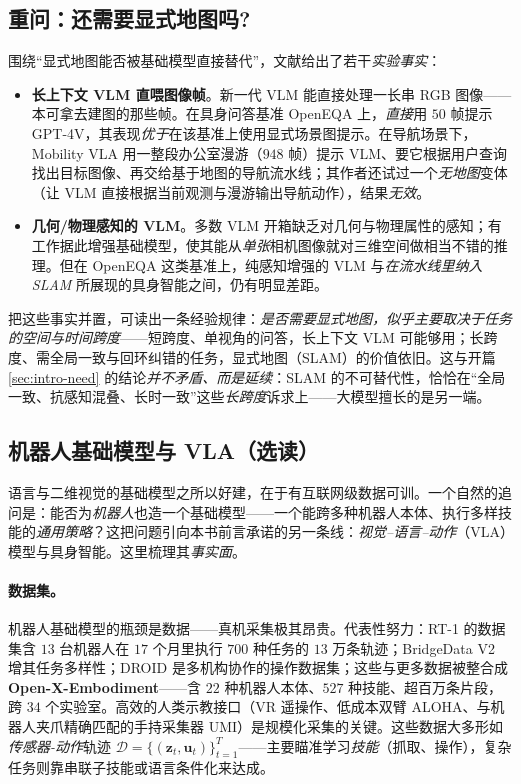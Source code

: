 \subsection{重问：还需要显式地图吗?}
\label{sec:openworld-needmap}

围绕“显式地图能否被基础模型直接替代”，文献给出了若干\emph{实验事实}：

\begin{itemize}
  \item \textbf{长上下文 VLM 直喂图像帧}。新一代 VLM 能直接处理一长串 RGB 图像——本可拿去建图的那些帧。在具身问答基准 OpenEQA 上，\emph{直接}用 $50$ 帧提示 GPT-4V，其表现\emph{优于}在该基准上使用显式场景图提示\cite{paull2026openworld}。在导航场景下，Mobility VLA 用一整段办公室漫游（$948$ 帧）提示 VLM、要它根据用户查询找出目标图像、再交给基于地图的导航流水线；其作者还试过一个\emph{无地图}变体（让 VLM 直接根据当前观测与漫游输出导航动作），结果\emph{无效}\cite{paull2026openworld}。
  \item \textbf{几何/物理感知的 VLM}。多数 VLM 开箱缺乏对几何与物理属性的感知；有工作据此增强基础模型，使其能从\emph{单张}相机图像就对三维空间做相当不错的推理。但在 OpenEQA 这类基准上，纯感知增强的 VLM 与\emph{在流水线里纳入 SLAM} 所展现的具身智能之间，仍有明显差距\cite{paull2026openworld}。
\end{itemize}

\noindent 把这些事实并置，可读出一条经验规律：\emph{是否需要显式地图，似乎主要取决于任务的空间与时间跨度}——短跨度、单视角的问答，长上下文 VLM 可能够用；长跨度、需全局一致与回环纠错的任务，显式地图（SLAM）的价值依旧。这与开篇 \cref{sec:intro-need} 的结论\emph{并不矛盾、而是延续}：SLAM 的不可替代性，恰恰在“全局一致、抗感知混叠、长时一致”这些\emph{长跨度}诉求上——大模型擅长的是另一端。

\subsection{机器人基础模型与 VLA（选读）}
\label{sec:openworld-vla}

语言与二维视觉的基础模型之所以好建，在于有互联网级数据可训。一个自然的追问是：能否为\emph{机器人}也造一个基础模型——一个能跨多种机器人本体、执行多样技能的\emph{通用策略}？这把问题引向本书前言承诺的另一条线：\emph{视觉–语言–动作}（VLA）模型与具身智能。这里梳理其\emph{事实面}。

\paragraph{数据集。}
机器人基础模型的瓶颈是数据——真机采集极其昂贵。代表性努力\cite{paull2026openworld}：RT-1 的数据集含 $13$ 台机器人在 $17$ 个月里执行 $700$ 种任务的 $13$ 万条轨迹；BridgeData V2 增其任务多样性；DROID 是多机构协作的操作数据集；这些与更多数据被整合成 \textbf{Open-X-Embodiment}——含 $22$ 种机器人本体、$527$ 种技能、超百万条片段，跨 $34$ 个实验室。高效的人类示教接口（VR 遥操作、低成本双臂 ALOHA、与机器人夹爪精确匹配的手持采集器 UMI）是规模化采集的关键。这些数据大多形如\emph{传感器-动作}轨迹 $\mathcal{D}=\{(\mathbf{z}_t,\mathbf{u}_t)\}_{t=1}^{T}$——主要瞄准学习\emph{技能}（抓取、操作），复杂任务则靠串联子技能或语言条件化来达成。

